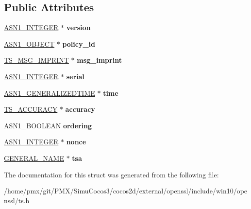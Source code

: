 \subsection*{Public Attributes}
\begin{DoxyCompactItemize}
\item 
\mbox{\label{structTS__tst__info__st_ad0e7ab1536c6e4ecae58bc6f0538b4dc}} 
\hyperlink{structasn1__string__st}{A\+S\+N1\+\_\+\+I\+N\+T\+E\+G\+ER} $\ast$ {\bfseries version}
\item 
\mbox{\label{structTS__tst__info__st_a59787f93711b76c27283f254d4a767b3}} 
\hyperlink{structasn1__object__st}{A\+S\+N1\+\_\+\+O\+B\+J\+E\+CT} $\ast$ {\bfseries policy\+\_\+id}
\item 
\mbox{\label{structTS__tst__info__st_adae22a923e0d2be1b9b42a1b65ad6421}} 
\hyperlink{structTS__msg__imprint__st}{T\+S\+\_\+\+M\+S\+G\+\_\+\+I\+M\+P\+R\+I\+NT} $\ast$ {\bfseries msg\+\_\+imprint}
\item 
\mbox{\label{structTS__tst__info__st_ab450625d8b03f76e3382e5f3b6a35896}} 
\hyperlink{structasn1__string__st}{A\+S\+N1\+\_\+\+I\+N\+T\+E\+G\+ER} $\ast$ {\bfseries serial}
\item 
\mbox{\label{structTS__tst__info__st_a8b6a1201796f7e1b5b961ee86ab55681}} 
\hyperlink{structasn1__string__st}{A\+S\+N1\+\_\+\+G\+E\+N\+E\+R\+A\+L\+I\+Z\+E\+D\+T\+I\+ME} $\ast$ {\bfseries time}
\item 
\mbox{\label{structTS__tst__info__st_a4ffba57649f2c0e48348a2c2894de46b}} 
\hyperlink{structTS__accuracy__st}{T\+S\+\_\+\+A\+C\+C\+U\+R\+A\+CY} $\ast$ {\bfseries accuracy}
\item 
\mbox{\label{structTS__tst__info__st_a4410b2d0d0f5ebc631a41804c0a92ad8}} 
A\+S\+N1\+\_\+\+B\+O\+O\+L\+E\+AN {\bfseries ordering}
\item 
\mbox{\label{structTS__tst__info__st_af2de206a30ac43b6c0048e1b78774ca4}} 
\hyperlink{structasn1__string__st}{A\+S\+N1\+\_\+\+I\+N\+T\+E\+G\+ER} $\ast$ {\bfseries nonce}
\item 
\mbox{\label{structTS__tst__info__st_aa4b23c96f4a2a053c56b46f7622a4a2c}} 
\hyperlink{structGENERAL__NAME__st}{G\+E\+N\+E\+R\+A\+L\+\_\+\+N\+A\+ME} $\ast$ {\bfseries tsa}
\end{DoxyCompactItemize}


The documentation for this struct was generated from the following file\+:\begin{DoxyCompactItemize}
\item 
/home/pmx/git/\+P\+M\+X/\+Simu\+Cocos3/cocos2d/external/openssl/include/win10/openssl/ts.\+h\end{DoxyCompactItemize}
